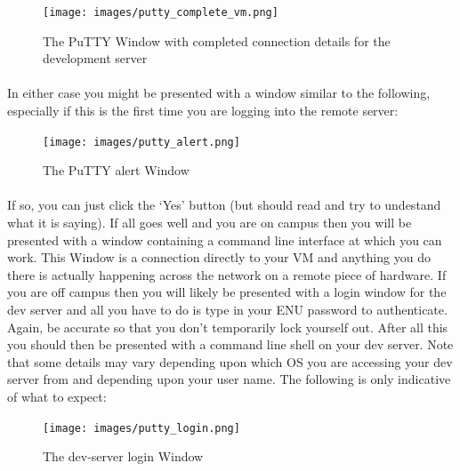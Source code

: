 \documentclass[12pt, a4paper, oneside]{book}
\begin{document}
\begin{figure}[H]
\centering
\texttt{[image: images/putty\_complete\_vm.png]}
\caption{The PuTTY Window with completed connection details for the development server}
\label{fig:putty-complete}
\end{figure}


\paragraph{} In either case you might be presented with a window similar to the following, especially if this is the first time you are logging into the remote server:

\begin{figure}[H]
\centering
\texttt{[image: images/putty\_alert.png]}
\caption{The PuTTY alert Window}
\label{fig:putty-alert}
\end{figure}

\paragraph{} If so, you can just click the `Yes' button (but should read and try to undestand what it is saying). If all goes well and you are on campus then you will be presented with a window containing a command line interface at which you can work. This Window is a connection directly to your VM and anything you do there is actually happening across the network on a remote piece of hardware. If you are off campus then you will likely be presented with a login window for the dev server and all you have to do is type in your ENU password to authenticate. Again, be accurate so that you don't temporarily lock yourself out. After all this you should then be presented with a command line shell on your dev server. Note that some details may vary depending upon which OS you are accessing your dev server from and depending upon your user name. The following is only indicative of what to expect:

\begin{figure}[H]
\centering
\texttt{[image: images/putty\_login.png]}
\caption{The dev-server login Window}
\label{fig:dev-server-login-window}
\end{figure}
\end{document}

